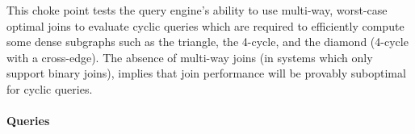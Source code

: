 
This choke point tests the query engine's ability to use multi-way, worst-case
optimal joins to evaluate cyclic queries which are required to efficiently
compute some dense subgraphs such as the triangle, the 4-cycle, and the diamond
(4-cycle with a cross-edge). The absence of multi-way joins (\eg in systems
which only support binary joins), implies that join performance will be provably
suboptimal for cyclic queries.


\paragraph{Queries}
{\raggedright
}
